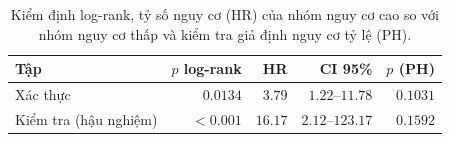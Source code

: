 \begin{table}[H]
\centering\small
\caption[Log-rank và HR theo nhóm nguy cơ]{Kiểm định log-rank, tỷ số nguy cơ (HR) của nhóm nguy cơ cao so với nhóm nguy cơ thấp và kiểm tra giả định nguy cơ tỷ lệ (PH).}
\label{tab:km-statistics}
\begin{tabularx}{\linewidth}{@{}Y r r r r@{}}
\toprule
\textbf{Tập} & \textbf{$p$ log-rank} & \textbf{HR} & \textbf{CI 95\%} & \textbf{$p$ (PH)} \\
\midrule
Xác thực & $0.0134$ & $3.79$ & $1.22$--$11.78$ & $0.1031$ \\
Kiểm tra (hậu nghiệm) & $<0.001$ & $16.17$ & $2.12$--$123.17$ & $0.1592$ \\
\bottomrule
\end{tabularx}
\end{table}
